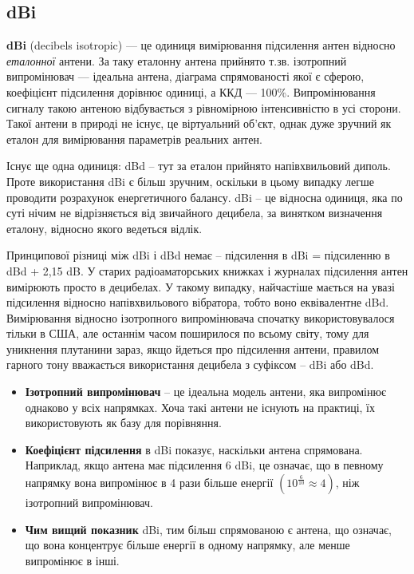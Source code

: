\documentclass{article}
\begin{document}
\subsection{dBi}


\textbf{dBi} (decibels isotropic) --- це одиниця вимірювання підсилення антен відносно \textit{еталонної} антени. За таку еталонну антена прийнято т.зв. ізотропний випромінювач — ідеальна антена, діаграма спрямованості якої є сферою, коефіцієнт підсилення дорівнює одиниці, а ККД — 100\%. Випромінювання сигналу такою антеною відбувається з рівномірною інтенсивністю в усі сторони. Такої антени в природі не існує, це віртуальний об'єкт, однак дуже зручний як еталон для вимірювання параметрів реальних антен.

Існує ще одна одиниця: dBd -- тут за еталон прийнято напівхвильовий диполь. Проте використання dBi є більш зручним, оскільки в цьому випадку легше проводити розрахунок енергетичного балансу. dBi -- це відносна одиниця, яка по суті нічим не відрізняється від звичайного децибела, за винятком визначення еталону, відносно якого ведеться відлік.

Принципової різниці між dBi і dBd немає -- підсилення в dBi = підсиленню в dBd + 2,15 dB. У старих радіоаматорських книжках і журналах підсилення антен вимірюють просто в децибелах. У такому випадку, найчастіше мається на увазі підсилення відносно напівхвильового вібратора, тобто воно еквівалентне dBd. Вимірювання відносно ізотропного випромінювача спочатку використовувалося тільки в США, але останнім часом поширилося по всьому світу, тому для уникнення плутанини зараз, якщо йдеться про підсилення антени, правилом гарного тону вважається використання децибела з суфіксом -- dBi або dBd.


\begin{itemize}[noitemsep, topsep=8pt]
\item \textbf{Ізотропний випромінювач} -- це ідеальна модель антени, яка випромінює однаково у всіх напрямках. Хоча такі антени не існують на практиці, їх використовують як базу для порівняння.
\item \textbf{Коефіцієнт підсилення} в dBi показує, наскільки антена спрямована. Наприклад, якщо антена має підсилення 6 dBi, це означає, що в певному напрямку вона випромінює в 4 рази більше енергії $(10^{\frac{6}{10}} \approx 4)$, ніж ізотропний випромінювач.
\item \textbf{Чим вищий показник} dBi, тим більш спрямованою є антена, що означає, що вона концентрує більше енергії в одному напрямку, але менше випромінює в інші.
\end{itemize}
\end{document}
